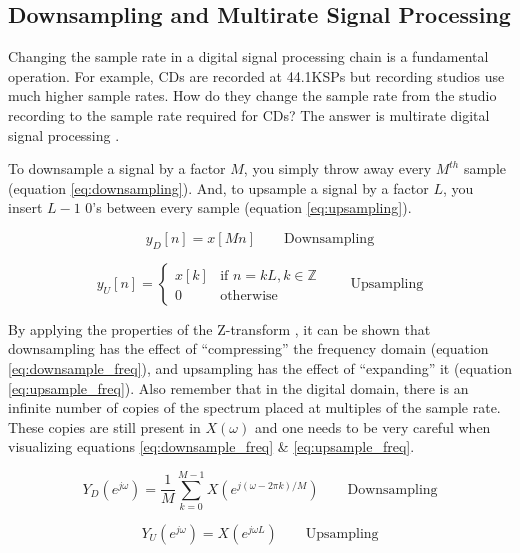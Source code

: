 \documentclass[a4paper, 12pt]{article}
\begin{document}
\subsection{Downsampling and Multirate Signal Processing}
\label{sec:downsampling}
Changing the sample rate in a digital signal processing chain is a fundamental operation.  For example, CDs are recorded at 44.1KSPs but recording studios use much higher sample rates.  How do they change the sample rate from the studio recording to the sample rate required for CDs?  The answer is multirate digital signal processing \cite{multirate1} \cite{multirate2}.

To downsample a signal by a factor $M$, you simply throw away every $M^{th}$ sample (equation \ref{eq:downsampling}).  And, to upsample a signal by a factor $L$, you insert $L - 1$ 0's between every sample (equation \ref{eq:upsampling}).

\begin{equation}
\label{eq:downsampling}
y_D[n] = x[Mn] \qquad \text{Downsampling}
\end{equation}

\begin{equation}
\label{eq:upsampling}
y_U[n] = 
  \begin{cases}
    x[k] & \text{if } n = kL, k \in \mathbb{Z} \\
    0 & \text{otherwise}
  \end{cases}
  \qquad \text{Upsampling}
\end{equation}

By applying the properties of the Z-transform \cite{multirate2}, it can be shown that downsampling has the effect of ``compressing'' the frequency domain (equation \ref{eq:downsample_freq}), and upsampling has the effect of ``expanding'' it (equation \ref{eq:upsample_freq}).  Also remember that in the digital domain, there is an infinite number of copies of the spectrum placed at multiples of the sample rate.  These copies are still present in $X(\omega)$ and one needs to be very careful when visualizing equations \ref{eq:downsample_freq} \& \ref{eq:upsample_freq}.

\begin{equation}
\label{eq:downsample_freq}
Y_D(e^{j\omega}) = \frac{1}{M}\sum_{k=0}^{M-1}X(e^{j(\omega - 2\pi k)/M}) \qquad \text{Downsampling}
\end{equation}

\begin{equation}
\label{eq:upsample_freq}
Y_U(e^{j\omega}) = X(e^{j\omega L}) \qquad \text{Upsampling}
\end{equation}
\end{document}
